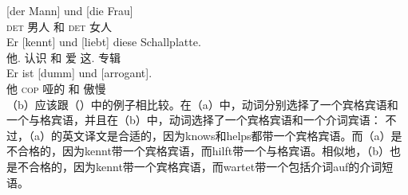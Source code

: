 \eal
\ex 
\gll {}[der Mann] und [die Frau]\\
	 {}\spacebr{}\textsc{det} 男人 和 \spacebr{}\textsc{det} 女人\\
\ex 
\gll Er [kennt] und [liebt] diese Schallplatte.\\
	 他.\nom{} \spacebr{}认识 和 \spacebr{}爱 这.\acc{} 专辑\\
\ex 
\gll Er ist [dumm] und [arrogant].\\
	他 \textsc{cop} \spacebr{}哑的 和 \spacebr{}傲慢\\
\zl
（b）应该跟（）中的例子相比较。在（a）中，动词分别选择了一个宾格宾语和一个与格宾语，并且在（b）中，动词选择了一个宾格宾语和一个介词宾语：
\eal
{}
\zl
不过，（a）的英文译文是合适的，因为knows和helps都带一个宾格宾语。而（a）是不合格的，因为kennt带一个宾格宾语，而hilft带一个与格宾语。相似地，（b）也是不合格的，因为kennt带一个宾格宾语，而wartet带一个包括介词auf的介词短语。

